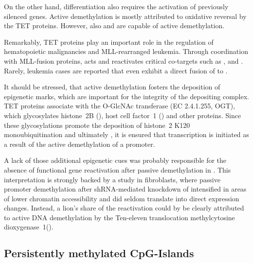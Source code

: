On the other hand, differentiation also requires the activation of previously silenced genes. Active demethylation is mostly attributed to oxidative reversal by the TET proteins.  However,  also  and  are capable of active demethylation\cite{Chen2012}.  

Remarkably, TET proteins play an important role in the regulation of hematopoietic malignancies and MLL-rearranged leukemia. Through coordination with MLL-fusion proteins,  acts and reactivates critical co-targets such as , and \cite{Huang2013,Huang2016a}. Rarely, leukemia cases are reported that even exhibit a direct fusion of  to \cite{Lorsbach2003,Lee2013}. 

It should be stressed, that active demethylation fosters the deposition of epigenetic marks, which are important for the integrity of the \hisfourthree depositing  complex. TET proteins associate with the O-GlcNAc transferase (EC 2.4.1.255, OGT), which glycosylates histone~2B (), host cell factor~1 () and other proteins\cite{Chen2013,Deplus2013}. Since these glycosylations promote the deposition of histone~2 K120 monoubiquitination\cite{Fujiki2011} and ultimately \hisfourthree, it is ensured that transcription is initiated as a result of the active demethylation of a promoter. 

A lack of those additional epigenetic cues was probably responsible for the absence of functional gene reactivation after passive demethylation in \dnmtchip{}. This interpretation is strongly backed by a study in fibroblasts, where passive promoter demethylation after shRNA-mediated knockdown of  intensified in areas of  lower chromatin accessibility and did seldom translate into direct expression changes\cite{He2019}. Instead, a lion's share of the reactivation could by be clearly attributed to active DNA demethylation by the Ten-eleven translocation methylcytosine dioxygenase~1()\cite{He2019}.

\subsection{Persistently methylated CpG-Islands} 
\label{chap:d:methylation:persistentregions:cgi:meth}

